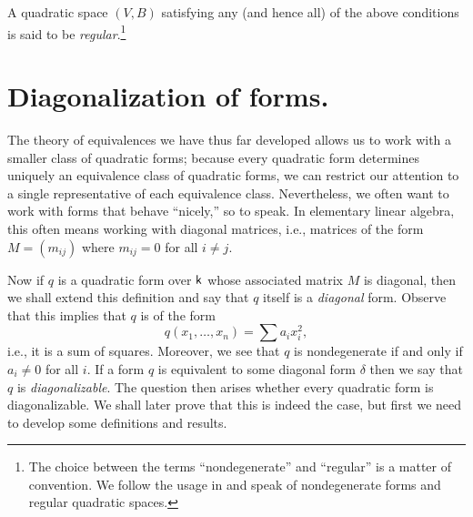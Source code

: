 A quadratic space \((V, B)\) satisfying any (and hence all) of the above
conditions is said to be \emph{regular}.\footnote{The choice between the terms
``nondegenerate'' and ``regular'' is a matter of convention. We follow the usage
in \cite{lam1973quadratic} and speak of nondegenerate forms and regular
quadratic spaces.}


\section{Diagonalization of forms.}

The theory of equivalences we have thus far developed allows us to work with a
smaller class of quadratic forms; because every quadratic form determines
uniquely an equivalence class of quadratic forms, we can restrict our attention
to a single representative of each equivalence class. Nevertheless, we often
want to work with forms that behave ``nicely,'' so to speak. In elementary
linear algebra, this often means working with diagonal matrices, i.e., matrices
of the form \(M = (m_{ij})\) where \(m_{ij} = 0\) for all \(i \neq j\).

Now if \(q\) is a quadratic form over \(\mathsf{k}\) whose associated matrix \(M\)
is diagonal, then we shall extend this definition and say that \(q\) itself is a
\emph{diagonal} form. Observe that this implies that \(q\) is of the form
\[
  q(x_1, \dots, x_n) = \sum a_i x_i^2,
\]
i.e., it is a sum of squares. Moreover, we see that \(q\) is nondegenerate if
and only if \(a_i \neq 0\) for all \(i\). If a form \(q\) is equivalent to some
diagonal form \(\delta\) then we say that \(q\) is \emph{diagonalizable}. The
question then arises whether every quadratic form is diagonalizable. We shall
later prove that this is indeed the case, but first we need to develop some
definitions and results.

